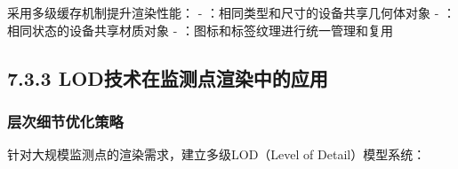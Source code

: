 
采用多级缓存机制提升渲染性能： - ：相同类型和尺寸的设备共享几何体对象 - ：相同状态的设备共享材质对象 - ：图标和标签纹理进行统一管理和复用

\hypertarget{lodux6280ux672fux5728ux76d1ux6d4bux70b9ux6e32ux67d3ux4e2dux7684ux5e94ux7528}{%
\subsection{7.3.3 LOD技术在监测点渲染中的应用}\label{lodux6280ux672fux5728ux76d1ux6d4bux70b9ux6e32ux67d3ux4e2dux7684ux5e94ux7528}}

\hypertarget{ux5c42ux6b21ux7ec6ux8282ux4f18ux5316ux7b56ux7565}{%
\subsubsection{层次细节优化策略}\label{ux5c42ux6b21ux7ec6ux8282ux4f18ux5316ux7b56ux7565}}


针对大规模监测点的渲染需求，建立多级LOD（Level of Detail）模型系统：

